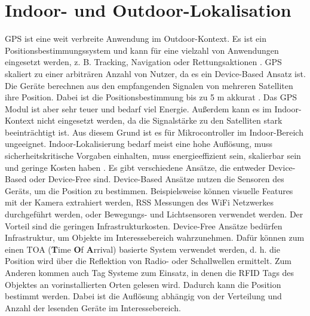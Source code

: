 \section{Indoor- und Outdoor-Lokalisation}
GPS ist eine weit verbreite Anwendung im Outdoor-Kontext.
Es ist ein Positionsbestimmungssystem und kann für eine vielzahl von Anwendungen eingesetzt werden,
z. B. Tracking, Navigation oder Rettungsaktionen \cite{kaplan2005understanding}.
GPS skaliert zu einer arbiträren Anzahl von Nutzer, da es ein Device-Based Ansatz ist.
Die Geräte berechnen aus den empfangenden Signalen von mehreren Satelliten ihre Position.
Dabei ist die Positionsbestimmung bis zu 5 m akkurat \cite{sadowski2018rssi}.
Das GPS Modul ist aber sehr teuer und bedarf viel Energie.
Außerdem kann es im Indoor-Kontext nicht eingesetzt werden, da die Signalstärke zu den Satelliten stark beeinträchtigt ist.
Aus diesem Grund ist es für Mikrocontroller im Indoor-Bereich ungeeignet.
\newline
\newline
Indoor-Lokalisierung bedarf meist eine hohe Auflösung, muss sicherheitskritische Vorgaben einhalten,
muss energieeffizient sein, skalierbar sein und geringe Kosten haben \cite{xiao2016survey}.
Es gibt verschiedene Ansätze, die entweder Device-Based oder Device-Free sind.
\newline
\newline
Device-Based Ansätze nutzen die Sensoren des Geräts, um die Position zu bestimmen.
Beispielsweise können visuelle Features mit der Kamera extrahiert werden,
RSS Messungen des WiFi Netzwerkes durchgeführt werden, oder Bewegungs- und Lichtsensoren verwendet werden.
Der Vorteil sind die geringen Infrastrukturkosten.
\newline
\newline
Device-Free Ansätze bedürfen Infrastruktur, um Objekte im Interessebereich wahrzunehmen.
Dafür können zum einen TOA (\textbf{T}ime \textbf{O}f \textbf{A}rrival) basierte System verwendet werden, d. h. die Position wird über
die Reflektion von Radio- oder Schallwellen ermittelt.
Zum Anderen kommen auch Tag Systeme zum Einsatz, in denen die RFID Tags des Objektes an vorinstallierten Orten gelesen wird.
Dadurch kann die Position bestimmt werden.
Dabei ist die Auflösung abhängig von der Verteilung und Anzahl der lesenden Geräte im Interessebereich.


